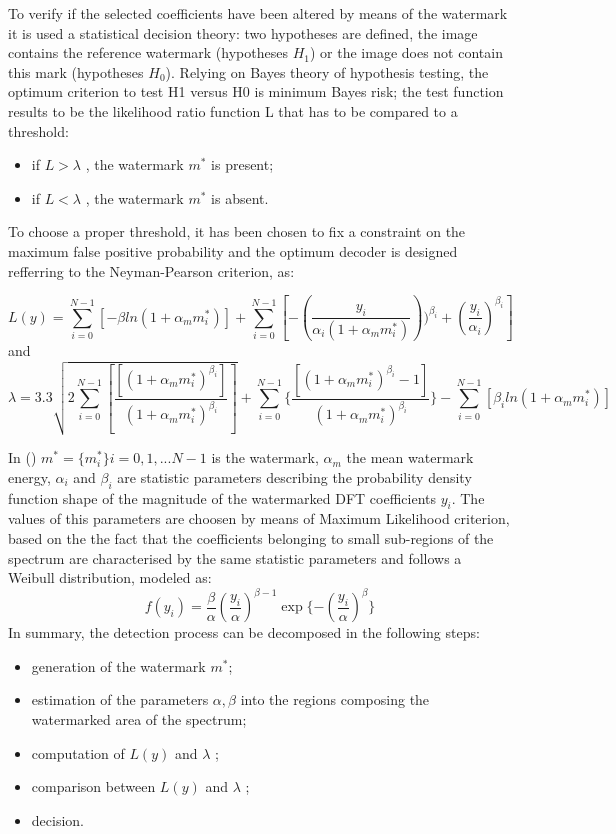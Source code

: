 To verify if the selected coefficients have been altered by means of the watermark it is used a statistical decision theory: two hypotheses are defined, the image contains the reference watermark (hypotheses $H_{1}$) or the image does not contain this mark (hypotheses $H_{0}$). Relying on Bayes theory of hypothesis testing, the optimum criterion to test H1 versus H0 is minimum Bayes risk; the test function results to be the likelihood ratio function L that has to be compared to a threshold:\newline
\begin{itemize}
\item if $L > \lambda$ ,  the watermark $m^{*}$ is present;
\item if $L < \lambda$ , the watermark  $m^{*}$ is absent.
\end{itemize}

To choose a proper threshold, it has been chosen to fix a constraint on the maximum false positive probability and the optimum decoder is designed refferring to the Neyman-Pearson criterion, as: \newline

$$ L(y)=\sum_{i=0}^{N-1} [-\beta ln(1+\alpha_{m}m_{i}^{*})]+\sum_{i=0}^{N-1}[-(\frac{y_{i}}{\alpha_{i}(1+\alpha_{m}m_{i}^{*})}))^{\beta_{i}}+(\frac{y_{i}}{\alpha_{i}})^{\beta_{i}}] $$
and
$$\lambda=3.3\sqrt{2\sum_{i=0}^{N-1}[\frac{[(1+\alpha_{m}m_{i}^{*})^{\beta_{i}}]}{(1+\alpha_{m}m_{i}^{*})^{\beta_{i}}}]} + \sum_{i=0}^{N-1}\{\frac{[(1+\alpha_{m}m_{i}^{*})^{\beta_{i}}-1]}{(1+\alpha_{m}m_{i}^{*})^{\beta_{i}}}\} - \sum_{i=0}^{N-1}[\beta_{i}ln(1+\alpha_{m}m_{i}^{*})]$$

In ()  $m^{*} = \{ m^{*}_{i} \} i= 0,1,...N-1$ is the watermark, $\alpha_{m}$ the mean watermark energy, $\alpha_{i}$ and $\beta_{i}$ are statistic parameters describing the probability density function shape of the magnitude of the watermarked DFT coefficients $y_{i}$.\newline 
The values of this parameters are choosen by means of Maximum Likelihood criterion, based on the the fact that the coefficients belonging to small
sub-regions of the spectrum are characterised by the same statistic parameters and follows a Weibull distribution, modeled as:
$$ f(y_{i}) = \frac{\beta}{\alpha}(\frac{y_{i}}{\alpha})^{\beta-1}\exp\{-(\frac{y_{i}}{\alpha})^{\beta}\}$$
In summary, the detection process can be decomposed in the following steps:
\begin{itemize}
\item generation of the watermark $m^{*}$;
\item estimation of the parameters $\alpha,\beta$ into the regions composing the watermarked area of the spectrum;
\item computation of $L(y)$ and $\lambda$ ;
\item comparison between $L(y)$ and $\lambda$ ;
\item decision.
\end{itemize}

